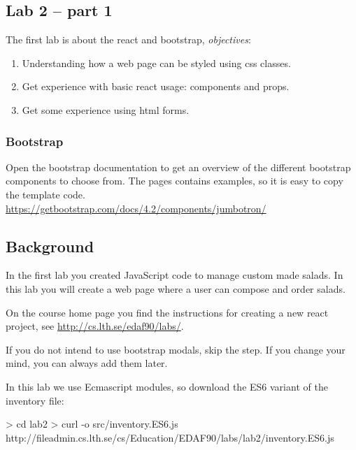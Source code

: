 \documentclass[fleqn, article, a4paper]{memoir}
\begin{document}
\maketitle
\thispagestyle{titlepage}
\vspace{-4cm}

\subsection*{Lab 2 -- part 1}

\n The first lab is about the react and bootstrap, \emph{objectives}:

\begin{enumerate}\firmlist
\item Understanding how a web page can be styled using css classes.
\item Get experience with basic react usage: components and props.
\item Get some experience using html forms.
\end{enumerate}

\subsubsection*{Bootstrap}
Open the bootstrap documentation to get an overview of the different bootstrap components to choose from. The pages contains examples, so it is easy to copy the template code.
\\ \url{https://getbootstrap.com/docs/4.2/components/jumbotron/}

\subsection*{Background}

In the first lab you created JavaScript code to manage custom made salads. In this lab you will create a web page where a user can compose and order salads.

On the course home page you find the instructions for creating a new react project, see \url{http://cs.lth.se/edaf90/labs/}.

If you do not intend to use bootstrap modals, skip the  step. If you change your mind, you can always add them later.

In this lab we use Ecmascript modules, so download the ES6 variant of the inventory file:
\begin{Code}
> cd lab2
> curl -o src/inventory.ES6.js 
          http://fileadmin.cs.lth.se/cs/Education/EDAF90/labs/lab2/inventory.ES6.js
\end{Code}
\end{document}
